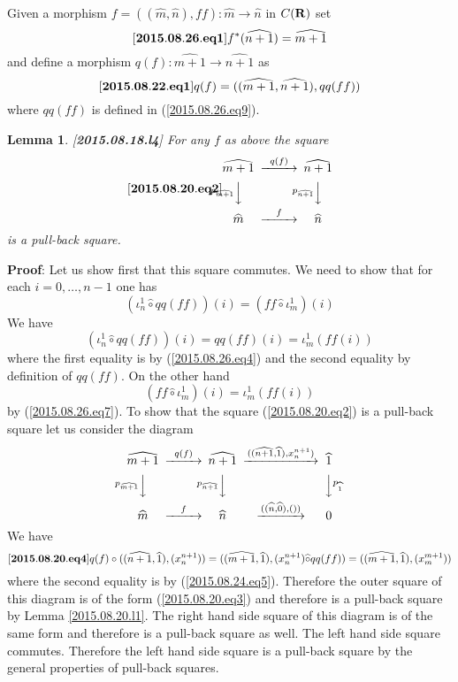 \documentclass[11pt]{article}
\newenvironment{eq}{\begin{equation}}{\end{equation}}
\newenvironment{proof}{{\bf Proof}:}{\vskip 5mm }
\newtheorem{lemma}[proposition]{Lemma}
\newcommand{\llabel}[1]{\label{#1}[{\bf #1}]}
\newcommand{\sr}{\rightarrow}
\newcommand{\rr}{{\bf R}}
\newcommand{\wh}{\widehat}
\newcommand{\hc}{\wh{\circ}}
\begin{document}
%
Given a morphism $f=((\wh{m},\wh{n}),ff):\wh{m}\sr \wh{n}$ in $C(\rr)$ set
%
\begin{eq}
\llabel{2015.08.26.eq1}
f^*(\wh{n+1})=\wh{m+1}
\end{eq}
%
and define a morphism $q(f):\wh{m+1}\sr \wh{n+1}$ as  
%
\begin{eq}
\llabel{2015.08.22.eq1}
q(f)=((\wh{m+1},\wh{n+1}),qq(ff))
\end{eq}
% 
where $qq(ff)$ is defined in (\ref{2015.08.26.eq9}).
%
\begin{lemma}
\llabel{2015.08.18.l4}
For any $f$ as above the square
%
\begin{eq}\llabel{2015.08.20.eq2}
\begin{CD}
\wh{m+1} @>q(f)>> \wh{n+1}\\
@Vp_{\wh{m+1}}VV @Vp_{\wh{n+1}}VV\\
\wh{m} @>f>> \wh{n}
\end{CD}
\end{eq}
%
is a pull-back square.
\end{lemma}
%
\begin{proof}
Let us show first that this square commutes. We need to show that for each $i=0,\dots, n-1$ one has
%
$$(\iota_n^1\hc qq(ff))(i)=(ff\hc \iota_m^1)(i)$$
%
We have
%
$$(\iota_n^1\hc qq(ff))(i)=qq(ff)(i)=\iota_m^1(ff(i))$$
%
where the first equality is by (\ref{2015.08.26.eq4}) and the second equality by definition of $qq(ff)$. On the other hand
%
$$(ff\hc \iota_m^1)(i)=\iota_m^1(ff(i))$$
%
by (\ref{2015.08.26.eq7}).  To show that the square (\ref{2015.08.20.eq2}) is a pull-back square let us consider the diagram
%
$$
\begin{CD}
\wh{m+1} @>q(f)>> \wh{n+1} @>((\wh{n+1},\wh{1}),x_n^{n+1})>> \wh{1}\\
@Vp_{\wh{m+1}}VV @Vp_{\wh{n+1}}VV @VVp_{\wh{1}}V\\
\wh{m} @>f>> \wh{n} @>((\wh{n},\wh{0}),())>> 0
\end{CD}
$$
%
We have
%
\begin{eq}\llabel{2015.08.20.eq4}
q(f)\circ ((\wh{n+1},\wh{1}),(x_n^{n+1}))=((\wh{m+1},\wh{1}),(x_n^{n+1})\hc qq(ff))=((\wh{m+1},\wh{1}),(x_m^{m+1}))
\end{eq}
%
where the second equality is by (\ref{2015.08.24.eq5}). Therefore the outer square of this diagram is of the form (\ref{2015.08.20.eq3}) and therefore is a pull-back square by Lemma \ref{2015.08.20.l1}. The right hand side square of this diagram is of the same form and therefore is a pull-back square as well. The left hand side square commutes. Therefore the left hand side square is a pull-back square by the general properties of pull-back squares.
\end{proof}
\end{document}
